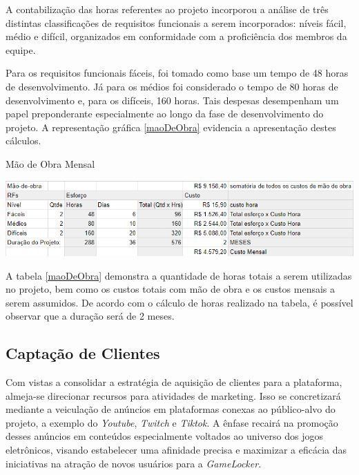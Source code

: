 A contabilização das horas referentes ao projeto incorporou a análise de três distintas classificações de requisitos funcionais a serem incorporados: níveis fácil, médio e difícil, organizados em conformidade com a proficiência dos membros da equipe.

Para os requisitos funcionais fáceis, foi tomado como base um tempo de 48 horas de desenvolvimento. Já para os médios foi considerado o tempo de 80 horas de desenvolvimento e, para os difíceis, 160 horas. Tais despesas desempenham um papel preponderante especialmente ao longo da fase de desenvolvimento do projeto. A representação gráfica \ref{maoDeObra} evidencia a apresentação destes cálculos.

\begin{table}[H]
    \center
    \setcounter{table}{1}
	\caption{Mão de Obra Mensal}
    \includegraphics[scale=0.75]{imagens/viabilidadeFinanceira/MaoDeObra.png}
    \label{maoDeObra}
    \setcounter{table}{2}
\end{table}

A tabela \ref{maoDeObra} demonstra a quantidade de horas totais a serem utilizadas no projeto, bem como os custos totais com mão de obra e os custos mensais a serem assumidos. De acordo com o cálculo de horas realizado na tabela, é possível observar que a duração será de 2 meses.

\subsection{Captação de Clientes}

Com vistas a consolidar a estratégia de aquisição de clientes para a plataforma, almeja-se direcionar recursos para atividades de marketing. Isso se concretizará mediante a veiculação de anúncios em plataformas conexas ao público-alvo do projeto, a exemplo do \textit{\gls{Youtube}}, \textit{\gls{Twitch}} e \textit{\gls{Tiktok}}. A ênfase recairá na promoção desses anúncios em conteúdos especialmente voltados ao universo dos jogos eletrônicos, visando estabelecer uma afinidade precisa e maximizar a eficácia das iniciativas na atração de novos usuários para a \textit{GameLocker}.


